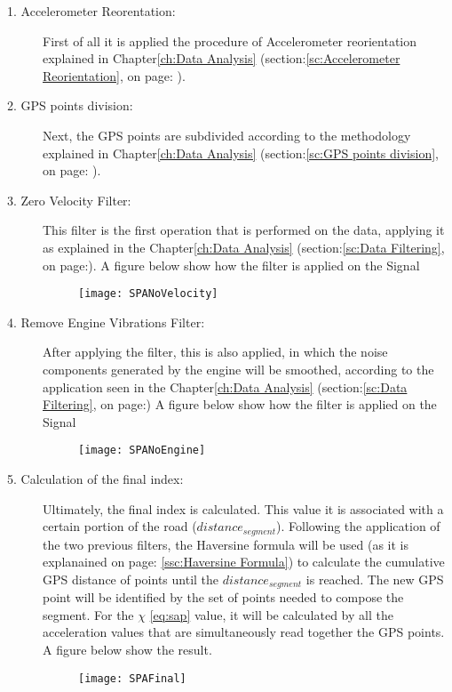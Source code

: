 \documentclass[tesi]{subfiles}
\begin{document}
\begin{description}
\item[1. Accelerometer Reorentation:] First of all it is applied the procedure of Accelerometer reorientation explained in Chapter\ref{ch:Data Analysis} (section:\ref{sc:Accelerometer Reorientation}, on page: \pageref{sc:Accelerometer Reorientation}).
\item[2. GPS points division:] Next, the GPS points are subdivided according to the methodology explained in Chapter\ref{ch:Data Analysis} (section:\ref{sc:GPS points division}, on page: \pageref{sc:GPS points division}).
\item[3. Zero Velocity Filter:] This filter is the first operation that is performed on the data, applying it as explained in the Chapter\ref{ch:Data Analysis} (section:\ref{sc:Data Filtering}, on page:\pageref{sssc:Zero Velocity Filter}). A figure below show how the filter is applied on the Signal
\begin{figure}[H]
\centering
\texttt{[image: SPANoVelocity]}
\end{figure}
\item[4. Remove Engine Vibrations Filter:]After applying the filter, this is also applied, in which the noise components generated by the engine will be smoothed, according to the application seen in the Chapter\ref{ch:Data Analysis} (section:\ref{sc:Data Filtering}, on page:\pageref{sssc:Remove Engine Vibrations Filter})
A figure below show how the filter is applied on the Signal
\begin{figure}[H]
\centering
\texttt{[image: SPANoEngine]}
\end{figure}
\item[5. Calculation of the final index:] Ultimately, the final index is calculated. 
This value it is associated with a certain portion of the road ($distance_{segment}$). Following the application of the two previous filters, the Haversine formula will be used (as it is explanained on page: \ref{ssc:Haversine Formula}) to calculate the cumulative GPS distance of points until the $distance_{segment}$ is reached. The new GPS point will be identified by the set of points needed to compose the segment. For the $\chi$ \thinspace \ref{eq:sap} value, it will be calculated by all the acceleration values that are simultaneously read together the GPS points.
A figure below show the result.
\begin{figure}[H]
\centering
\texttt{[image: SPAFinal]}
\end{figure}
\end{description}
\end{document}
